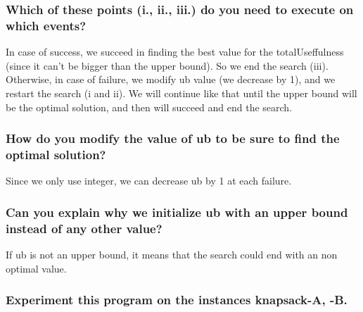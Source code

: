 \documentclass[a4paper ,12pt,french]{article}
\begin{document}
\subsubsection{Which of these points (i., ii., iii.) do you need to execute on which events?}
In case of success, we succeed in finding the best value for the totalUseffulness (since it can't be bigger than the upper bound). So we end the search (iii). Otherwise, in case of failure, we modify ub value (we decrease by 1), and we restart the search (i and ii).
We will continue like that until the upper bound will be the optimal solution, and then will succeed and end the search.


\subsubsection{How do you modify the value of ub to be sure to find the optimal solution?}

Since we only use integer, we can decrease ub by 1 at each failure.

\subsubsection{Can you explain why we initialize ub with an upper bound instead of any other value?}

If ub is not an upper bound, it means that the search could end with an non optimal value.

\subsubsection{Experiment this program on the instances knapsack-A, -B. }
\end{document}
